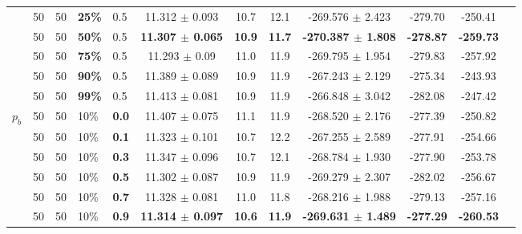 \begin{sidewaystable}
\begin{tabular}{|l|l|l|l|l||c|c|c|c|c|c|c|}
    ~ & 50 & 50 & \textbf{25\%} & 0.5  & 11.312 $\pm$ 0.093 & 10.7 & 12.1 & -269.576 $\pm$ 2.423 & -279.70 & -250.41 \\
    ~ & 50 & 50 & \textbf{50\%} & 0.5 & \textbf{11.307 $\pm$ 0.065} & \textbf{10.9} & \textbf{11.7} & \textbf{-270.387 $\pm$ 1.808}  & \textbf{-278.87} & \textbf{-259.73} \\
    ~ & 50 & 50 & \textbf{75\%} & 0.5  & 11.293 $\pm$ 0.09 & 11.0 & 11.9 & -269.795 $\pm$ 1.954 & -279.83 & -257.92 \\
    ~ & 50 & 50 & \textbf{90\%} & 0.5  & 11.389 $\pm$ 0.089 & 10.9 & 11.9 & -267.243 $\pm$ 2.129 & -275.34 & -243.93 \\
    ~ & 50 & 50 & \textbf{99\%} & 0.5  & 11.413 $\pm$ 0.081 & 10.9 & 11.9 & -266.848 $\pm$ 3.042 & -282.08 & -247.42  \\
    \hline
    $p_{b}$ & 50 & 50 & 10\% & \textbf{0.0} & 11.407 $\pm$ 0.075 & 11.1 & 11.9 & -268.520 $\pm$ 2.176 & -277.39 & -250.82 \\
    ~ & 50 & 50 & 10\% & \textbf{0.1} & 11.323 $\pm$ 0.101 & 10.7 & 12.2 & -267.255 $\pm$ 2.589 & -277.91 & -254.66 \\
    ~ & 50 & 50 & 10\% & \textbf{0.3}& 11.347 $\pm$ 0.096 & 10.7 & 12.1 & -268.784 $\pm$ 1.930 & -277.90 & -253.78 \\
    ~ & 50 & 50 & 10\% & \textbf{0.5}& 11.302 $\pm$ 0.087 & 10.9 & 11.9 & -269.279 $\pm$ 2.307 & -282.02 & -256.67\\
    ~ & 50 & 50 & 10\% & \textbf{0.7}& 11.328 $\pm$ 0.081 & 11.0 & 11.8 & -268.216 $\pm$ 1.988 & -279.13 & -257.16\\
    ~ & 50 & 50 & 10\% & \textbf{0.9} & \textbf{11.314 $\pm$ 0.097} & \textbf{10.6} & \textbf{11.9} & \textbf{-269.631 $\pm$ 1.489} & \textbf{-277.29} & \textbf{-260.53}\\
    
    
 

\end{tabular}
\end{sidewaystable}
